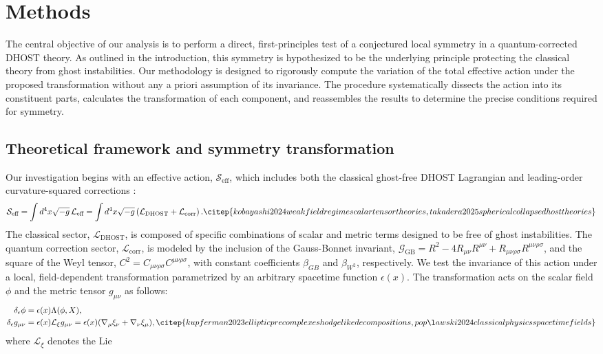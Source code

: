 \documentclass[twocolumn]{aastex631}
\begin{document}
\section{Methods}
\label{sec:methods}
The central objective of our analysis is to perform a direct, first-principles test of a conjectured local symmetry in a quantum-corrected DHOST theory. As outlined in the introduction, this symmetry is hypothesized to be the underlying principle protecting the classical theory from ghost instabilities. Our methodology is designed to rigorously compute the variation of the total effective action under the proposed transformation without any a priori assumption of its invariance. The procedure systematically dissects the action into its constituent parts, calculates the transformation of each component, and reassembles the results to determine the precise conditions required for symmetry.\subsection{Theoretical framework and symmetry transformation}Our investigation begins with an effective action, $\mathcal{S}_{\text{eff}}$, which includes both the classical ghost-free DHOST Lagrangian \citep{nezhad2025degeneratehigherorderscalartensortheories} and leading-order curvature-squared corrections \citep{lambiase2025exorcisingghostsgravitationalwaves}:\begin{equation}\mathcal{S}_{\text{eff}} = \int d^4x \sqrt{-g} \, \mathcal{L}_{\text{eff}} = \int d^4x \sqrt{-g} \left( \mathcal{L}_{\text{DHOST}} + \mathcal{L}_{\text{corr}} \right). \citep{kobayashi2024weakfieldregimescalartensortheories,takadera2025sphericalcollapsedhosttheories}\end{equation}The classical sector, $\mathcal{L}_{\text{DHOST}}$, is composed of specific combinations of scalar and metric terms designed to be free of ghost instabilities. The quantum correction sector, $\mathcal{L}_{\text{corr}}$, is modeled by the inclusion of the Gauss-Bonnet invariant, $\mathcal{G}_{\text{GB}} = R^2 - 4R_{\mu\nu}R^{\mu\nu} + R_{\mu\nu\rho\sigma}R^{\mu\nu\rho\sigma}$, and the square of the Weyl tensor, $C^2 = C_{\mu\nu\rho\sigma}C^{\mu\nu\rho\sigma}$, with constant coefficients $\beta_{GB}$ and $\beta_{W^2}$, respectively. \citep{cheung2017positivitycurvaturesquaredcorrectionsgravity,sucu2025quantumcorrectedthermodynamicsconformalweyl}We test the invariance of this action under a local, field-dependent transformation parametrized by an arbitrary spacetime function $\epsilon(x)$. The transformation acts on the scalar field $\phi$ and the metric tensor $g_{\mu\nu}$ as follows: \citep{jarv2015transformationpropertiesgeneralrelativity,babichev2024generalisationconformaldisformaltransformationsmetric}\begin{align}\delta_\epsilon \phi &= \epsilon(x) \Lambda(\phi, X), \\\delta_\epsilon g_{\mu\nu} &= \epsilon(x) \mathcal{L}_{\xi} g_{\mu\nu} = \epsilon(x) (\nabla_\mu \xi_\nu + \nabla_\nu \xi_\mu),  \citep{kupferman2023ellipticprecomplexeshodgelikedecompositions,popławski2024classicalphysicsspacetimefields}\end{align}where $\mathcal{L}_{\xi}$ denotes the Lie 
\end{document}
